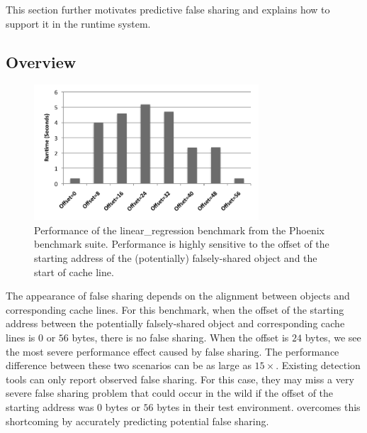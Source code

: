 \label{sec:prediction}
This section further motivates predictive false sharing and explains how to support it in the runtime system.  

\subsection{Overview}
\label{sec:predictoverview}

\begin{figure}[!t]
\begin{center}
\includegraphics[width=3.3in]{fig/perfsensitive}
\end{center}
\caption{
Performance of the linear\_regression benchmark from the Phoenix benchmark suite.
Performance is highly sensitive to the offset of the starting address of the (potentially) falsely-shared object 
and the start of cache line. 
\label{fig:perfsensitive}}
\end{figure}

The appearance of false sharing depends on 
the alignment between objects and corresponding cache lines.
For this benchmark,
when the offset of the starting address between the potentially falsely-shared object and corresponding cache lines 
is $0$ or $56$ bytes, 
there is no false sharing. 
When the offset is $24$ bytes, we see the most severe performance effect caused 
by false sharing. 
The performance difference between these two scenarios can be as large as $15\times$. 
Existing detection tools can only report observed false sharing.
For this case, they may miss a very severe false sharing problem that could occur in the wild if the offset of the starting 
address was $0$ bytes or $56$ bytes in their test environment.
\Predator{} overcomes this shortcoming by accurately predicting potential false sharing.


